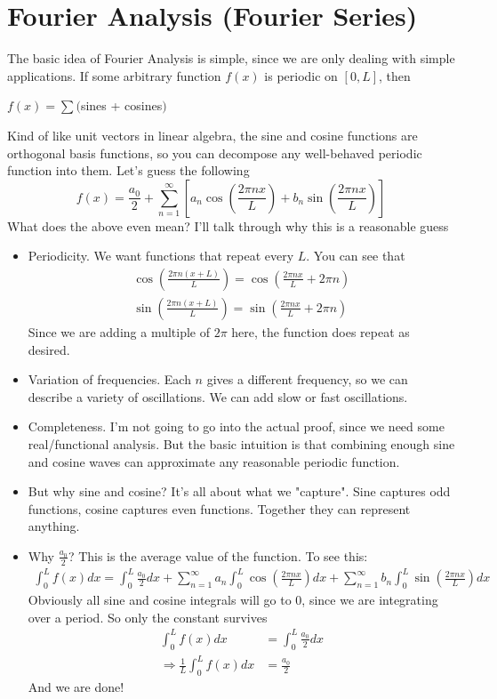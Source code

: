 \documentclass{report}
\numberwithin{equation}{section}
\begin{document}
\section{Fourier Analysis (Fourier Series)}
The basic idea of Fourier Analysis is simple, since we are only dealing with simple applications. If some arbitrary function $f(x)$ is periodic on $[0,L]$, then
\begin{center}
	$f(x) = \sum($sines + cosines$)$
\end{center}
Kind of like unit vectors in linear algebra, the sine and cosine functions are orthogonal basis functions, so you can decompose any well-behaved periodic function into them. Let's guess the following
\begin{equation}
	f(x) = \frac{a_0}{2}+\sum^{\infty}_{n=1}\left[a_n\cos\left(\frac{2\pi nx}{L}\right) + b_n\sin\left(\frac{2\pi nx}{L}\right)\right]
\end{equation}
What does the above even mean? I'll talk through why this is a reasonable guess
\begin{itemize}
	\item Periodicity. We want functions that repeat every $L$. You can see that
	\begin{align*}
		\cos\left(\frac{2\pi n(x+L)}{L}\right) = \cos\left(\frac{2\pi nx}{L}+2\pi n\right)\\
		\sin\left(\frac{2\pi n(x+L)}{L}\right) = \sin\left(\frac{2\pi nx}{L}+2\pi n\right)
	\end{align*}
		Since we are adding a multiple of $2\pi$ here, the function does repeat as desired.
	\item Variation of frequencies. Each $n$ gives a different frequency, so we can describe a variety of oscillations. We can add slow or fast oscillations.
	\item Completeness. I'm not going to go into the actual proof, since we need some real/functional analysis. But the basic intuition is that combining enough sine and cosine waves can approximate any reasonable periodic function.
	\item But why sine and cosine? It's all about what we "capture". Sine captures odd functions, cosine captures even functions. Together they can represent anything.
	\item Why $\frac{a_0}{2}$? This is the average value of the function. To see this:
	\begin{align*}
		\int_0^Lf(x)dx = \int_0^L\frac{a_0}{2}dx + \sum^{\infty}_{n=1}a_n\int^L_0\cos\left(\frac{2\pi nx}{L}\right)dx + \sum^{\infty}_{n=1}b_n\int^L_0\sin\left(\frac{2\pi nx}{L}\right)dx
	\end{align*}
	Obviously all sine and cosine integrals will go to 0, since we are integrating over a period. So only the constant survives
	\begin{align*}
		\int^L_0f(x)dx &= \int^L_0\frac{a_0}{2}dx\\
		\Rightarrow \frac{1}{L}\int^L_0f(x)dx &=\frac{a_0}{2}
	\end{align*}
	And we are done!
\end{itemize}
\end{document}
